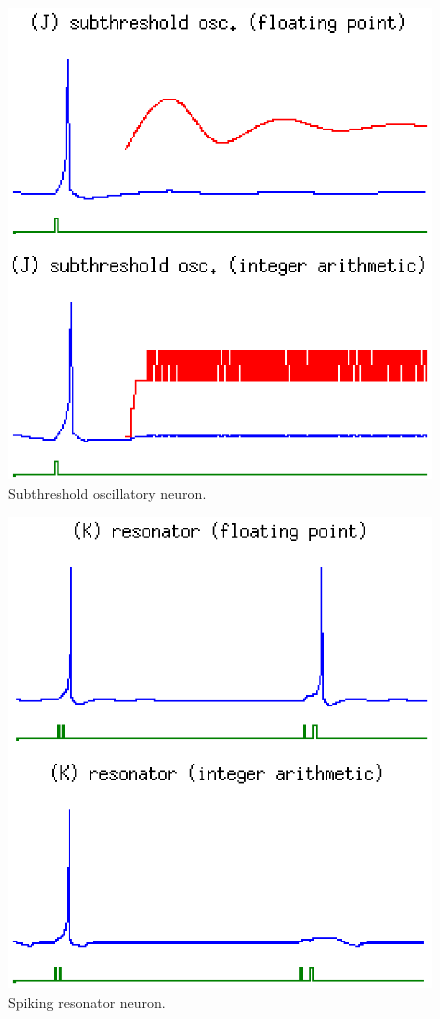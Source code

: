 \documentclass[journal]{./sty/IEEEtran}
\begin{document}
\begin{figure}
\centering
\includegraphics[scale=0.6]{imgs/izh_subthreshold_osc}
\caption{Subthreshold oscillatory neuron.\label{fig:osc}}
\end{figure}

\begin{figure}
\centering
\includegraphics[scale=0.6]{imgs/izh_resonator}
\caption{Spiking resonator neuron.\label{fig:reson8r}}
\end{figure}
\end{document}
